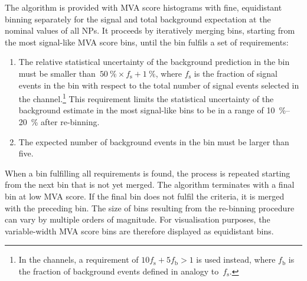 The algorithm is provided with MVA score histograms with fine, equidistant
binning separately for the signal and total background expectation at the
nominal values of all NPs. It proceeds by iteratively merging bins, starting
from the most signal-like MVA score bins, until the bin fulfils a set of
requirements:
\begin{enumerate}

\item The relative statistical uncertainty of the background prediction in the
  bin must be smaller
  than~\mbox{$\SI{50}{\percent} \times f_\text{s} + \SI{1}{\percent}$}, where
  $f_\text{s}$ is the fraction of signal events in the bin with respect to the
  total number of signal events selected in the channel.\footnote{In the \lephad
    channels, a requirement of $10 f_{\text{s}} + 5 f_{\text{b}} > 1$ is used
    instead, where $f_{\text{b}}$ is the fraction of background events defined
    in analogy to~$f_{\text{s}}$.} This requirement limits the statistical
  uncertainty of the background estimate in the most signal-like bins to be in a
  range of \SIrange{10}{20}{\percent} after re-binning.

\item The expected number of background events in the bin must be larger than
  five.

\end{enumerate}
When a bin fulfilling all requirements is found, the process is repeated
starting from the next bin that is not yet merged. The algorithm terminates with
a final bin at low MVA score. If the final bin does not fulfil the criteria, it
is merged with the preceding bin.
The size of bins resulting from the re-binning procedure can vary by multiple
orders of magnitude. For visualisation purposes, the variable-width MVA score
bins are therefore displayed as equidistant bins.




